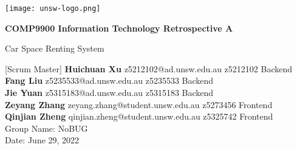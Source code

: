 \begin{titlepage}
  \begin{center}
      \vspace*{1cm}

      \texttt{[image: unsw-logo.png]}

      \Huge
      \textbf{COMP9900 Information Technology Retrospective A}

      \vspace{0.5cm}
      \LARGE
      Car Space Renting System
           
      \vspace{1.5cm}
      \large
      [Scrum Master]
      \textbf{Huichuan Xu} z5212102@ad.unsw.edu.au z5212102 Backend\\
      \textbf{Fang Liu} z5235533@ad.unsw.edu.au z5235533 Backend\\
      \textbf{Jie Yuan} z5315183@ad.unsw.edu.au z5315183 Backend\\
      \textbf{Zeyang Zhang} zeyang.zhang@student.unsw.edu.au z5273456 Frontend\\
      \textbf{Qinjian Zheng} qinjian.zheng@student.unsw.edu.au z5325742 Frontend\\

      \vfill
      \Large
      Group Name: NoBUG\\
      Date: June 29, 2022
           
  \end{center}
\end{titlepage}